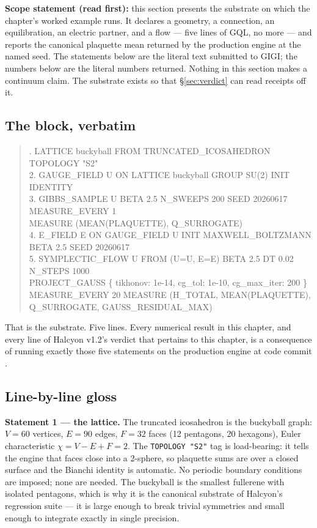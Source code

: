 \documentclass[12pt,a4paper]{article}
\newcommand{\hexsha}[1]{\texttt{\seqsplit{#1}}}
\theoremstyle{plain}
\theoremstyle{definition}
\theoremstyle{remark}
\begin{document}
\textbf{Scope statement (read first):} this section presents the substrate on which the chapter's worked example runs. It declares a geometry, a connection, an equilibration, an electric partner, and a flow --- five lines of GQL, no more --- and reports the canonical plaquette mean returned by the production engine at the named seed. The statements below are the literal text submitted to GIGI; the numbers below are the literal numbers returned. Nothing in this section makes a continuum claim. The substrate exists so that \S\ref{sec:verdict} can read receipts off it.

\subsection{The block, verbatim}
\label{subsec:block}

\begin{quote}\small{}. LATTICE buckyball FROM TRUNCATED\_ICOSAHEDRON TOPOLOGY "S2"\\
2. GAUGE\_FIELD U ON LATTICE buckyball GROUP SU(2) INIT IDENTITY\\
3. GIBBS\_SAMPLE U BETA 2.5 N\_SWEEPS 200 SEED 20260617 MEASURE\_EVERY 1\\
\phantom{3. }MEASURE (MEAN(PLAQUETTE), Q\_SURROGATE)\\
4. E\_FIELD E ON GAUGE\_FIELD U INIT MAXWELL\_BOLTZMANN BETA 2.5 SEED 20260617\\
5. SYMPLECTIC\_FLOW U FROM (U=U, E=E) BETA 2.5 DT 0.02 N\_STEPS 1000\\
\phantom{5. }PROJECT\_GAUSS \{ tikhonov: 1e-14, cg\_tol: 1e-10, cg\_max\_iter: 200 \}\\
\phantom{5. }MEASURE\_EVERY 20 MEASURE (H\_TOTAL, MEAN(PLAQUETTE), Q\_SURROGATE, GAUSS\_RESIDUAL\_MAX)
\end{quote}

That is the substrate. Five lines. Every numerical result in this chapter, and every line of Halcyon v1.2's verdict that pertains to this chapter, is a consequence of running exactly those five statements on the production engine at code commit \hexsha{74b960fa6d5f52fb47a76b80c938aeadc8a89762}.

\subsection{Line-by-line gloss}
\label{subsec:gloss}

\textbf{Statement 1 --- the lattice.} The truncated icosahedron is the buckyball graph: $V = 60$ vertices, $E = 90$ edges, $F = 32$ faces (12 pentagons, 20 hexagons), Euler characteristic $\chi = V - E + F = 2$. The \texttt{TOPOLOGY "S2"} tag is load-bearing: it tells the engine that faces close into a 2-sphere, so plaquette sums are over a closed surface and the Bianchi identity is automatic. No periodic boundary conditions are imposed; none are needed. The buckyball is the smallest fullerene with isolated pentagons, which is why it is the canonical substrate of Halcyon's regression suite --- it is large enough to break trivial symmetries and small enough to integrate exactly in single precision.
\end{document}
